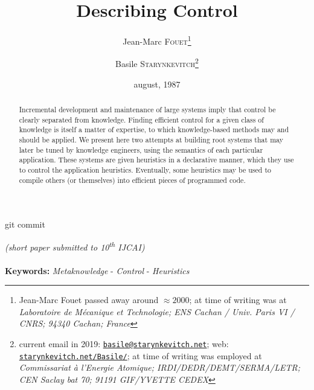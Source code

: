 \documentclass[11pt,a4paper,svgnames]{article}
\begin{document}


\date{august, 1987}

\title{Describing Control}

\author{Jean-Marc \textsc{Fouet}\thanks{Jean-Marc Fouet passed away
    around $\approx 2000$; at time of writing was at \emph{Laboratoire de
      Mécanique et Technologie; ENS Cachan / Univ. Paris VI / CNRS;
      94340 Cachan; France}}
\and
Basile \textsc{Starynkevitch}\thanks{current email in 2019:
    \href{mailto:basile@starynkevitch.net}{\texttt{basile@starynkevitch.net}};
    web:
    \href{http://starynkevitch.net/Basile/}{\texttt{starynkevitch.net/Basile/}};
    at time of writing was employed at \emph{Commissariat à l'Energie
      Atomique; IRDI/DEDR/DEMT/SERMA/LETR; CEN Saclay bat 70; 91191
      GIF/YVETTE CEDEX}}}

  \begin{titlepage}
    \maketitle

    \bigskip

    \begin{center}
      \begin{relsize}{-1.5}
        git commit \texttt{\gitcommit}
      \end{relsize}
    \end{center}

  \end{titlepage}

  \begin{center}
    \emph{(short paper submitted to 10\textsuperscript{th} IJCAI)}\\
      {}\\
    \textbf{Keywords:} \emph{Metaknowledge} - \emph{Control} - \emph{Heuristics}
  \end{center}

  \begin{abstract}
    Incremental development and maintenance of large systems imply that control
    be clearly separated from knowledge. Finding efficient control for a given
    class of knowledge is itself a matter of expertise, to which knowledge-based
    methods may and should be applied. We present here two attempts at building
    root systems that may later be tuned by knowledge engineers, using the
    semantics of each particular application. These systems are given heuristics
    in a declarative manner, which they use to control the application heuristics.
    Eventually, some heuristics may be used to compile others (or themselves) into
    efficient pieces of programmed code.
  \end{abstract}
\end{document}
